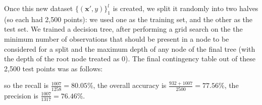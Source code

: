 Once this new dataset $\{({\mathbf{x}}', y)\}_1^l$ is created, we split it randomly into two halves (so each had 2,500 points): we used one as the training set, and the other as the test set. We trained a decision tree, after performing a grid search on the the minimum number of observations that should be present in a node to be considered for a split and the maximum depth of any node of the final tree (with the depth of the root node treated as 0). The final contingency table out of these 2,500 test points was as follows:


so the recall is $\frac{1007}{1258} = 80.05\%$, the overall accuracy is $\frac{932 + 1007}{2500} = 77.56\%$, the precision is $\frac{1007}{1317} = 76.46\%$. 



